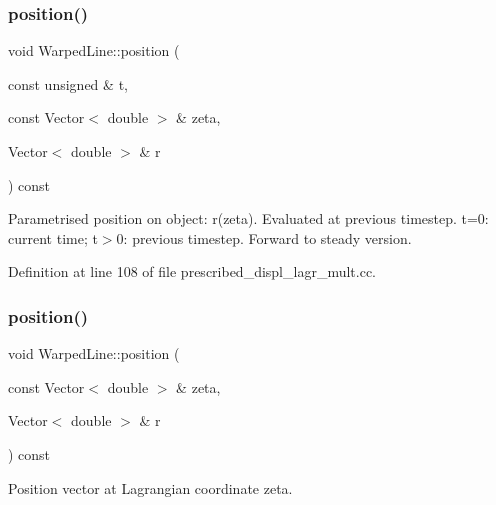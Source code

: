 \mbox{\label{classWarpedLine_a415d50f6bb49bd903015b51c66e93cd2}} 
\subsubsection{\texorpdfstring{position()}{position()}\hspace{0.1cm}{\footnotesize\ttfamily [4/6]}}
{\footnotesize\ttfamily void Warped\+Line\+::position (\begin{DoxyParamCaption}\item[{const unsigned \&}]{t,  }\item[{const Vector$<$ double $>$ \&}]{zeta,  }\item[{Vector$<$ double $>$ \&}]{r }\end{DoxyParamCaption}) const\hspace{0.3cm}{\ttfamily [inline]}}



Parametrised position on object\+: r(zeta). Evaluated at previous timestep. t=0\+: current time; t$>$0\+: previous timestep. Forward to steady version. 



Definition at line 108 of file prescribed\+\_\+displ\+\_\+lagr\+\_\+mult.\+cc.

\mbox{\label{classWarpedLine_aaeef89818148ee3a305c561e91c8851d}} 
\subsubsection{\texorpdfstring{position()}{position()}\hspace{0.1cm}{\footnotesize\ttfamily [5/6]}}
{\footnotesize\ttfamily void Warped\+Line\+::position (\begin{DoxyParamCaption}\item[{const Vector$<$ double $>$ \&}]{zeta,  }\item[{Vector$<$ double $>$ \&}]{r }\end{DoxyParamCaption}) const\hspace{0.3cm}{\ttfamily [inline]}}



Position vector at Lagrangian coordinate zeta. 



